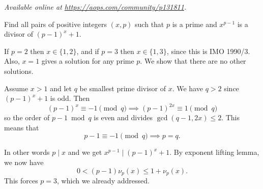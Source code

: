 \textsl{Available online at \url{https://aops.com/community/p131811}.}
\begin{mdframed}[style=mdpurplebox,frametitle={Problem statement}]
Find all pairs of positive integers $(x,p)$
such that $p$ is a prime and $x^{p-1}$ is a divisor of $ (p-1)^{x}+1$.
\end{mdframed}
If $p = 2$ then $x \in \{1,2\}$,
and if $p = 3$ then $x \in \{1,3\}$, since this is IMO 1990/3.
Also, $x = 1$ gives a solution for any prime $p$.
We show that there are no other solutions.

Assume $x > 1$ and let $q$ be smallest prime divisor of $x$.
We have $q > 2$ since $(p-1)^x+1$ is odd.
Then
\[ (p-1)^x \equiv -1 \pmod q \implies (p-1)^{2x} \equiv 1 \pmod q \]
so the order of $p-1 \bmod q$ is even and divides $\gcd(q-1,2x) \le 2$.
This means that
\[ p-1 \equiv -1 \pmod q \implies p = q. \]

In other words $p \mid x$ and we get $x^{p-1} \mid (p-1)^{x}+1$.
By exponent lifting lemma, we now have
\[ 0 < (p-1) \nu_{p}(x) \le 1 + \nu_p(x). \]
This forces $p=3$,
which we already addressed.
\pagebreak
